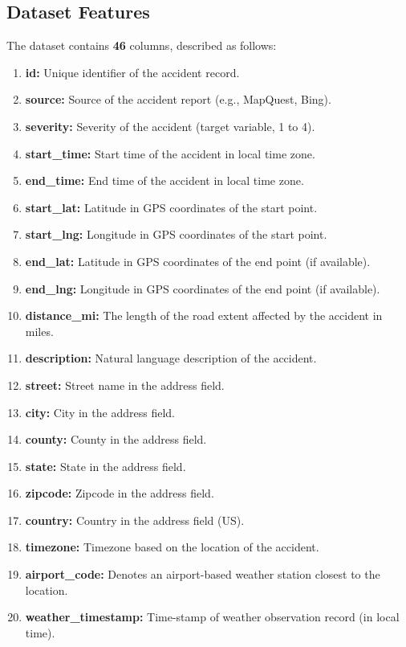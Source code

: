 \documentclass[11pt,a4paper]{article}
\begin{document}
\subsection*{Dataset Features}
The dataset contains \textbf{46} columns, described as follows:
\begin{enumerate}
    \item \textbf{id:} Unique identifier of the accident record.
    \item \textbf{source:} Source of the accident report (e.g., MapQuest, Bing).
    \item \textbf{severity:} Severity of the accident (target variable, 1 to 4).
    \item \textbf{start\_time:} Start time of the accident in local time zone.
    \item \textbf{end\_time:} End time of the accident in local time zone.
    \item \textbf{start\_lat:} Latitude in GPS coordinates of the start point.
    \item \textbf{start\_lng:} Longitude in GPS coordinates of the start point.
    \item \textbf{end\_lat:} Latitude in GPS coordinates of the end point (if available).
    \item \textbf{end\_lng:} Longitude in GPS coordinates of the end point (if available).
    \item \textbf{distance\_mi:} The length of the road extent affected by the accident in miles.
    \item \textbf{description:} Natural language description of the accident.
    \item \textbf{street:} Street name in the address field.
    \item \textbf{city:} City in the address field.
    \item \textbf{county:} County in the address field.
    \item \textbf{state:} State in the address field.
    \item \textbf{zipcode:} Zipcode in the address field.
    \item \textbf{country:} Country in the address field (US).
    \item \textbf{timezone:} Timezone based on the location of the accident.
    \item \textbf{airport\_code:} Denotes an airport-based weather station closest to the location.
    \item \textbf{weather\_timestamp:} Time-stamp of weather observation record (in local time).

\end{enumerate}
\end{document}
